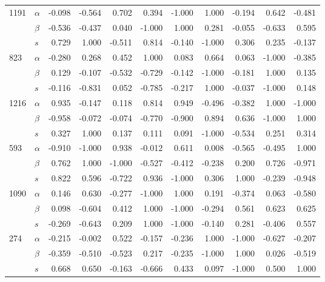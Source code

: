 \begin{longtable}{llrrrrrrrrr}
\cline{1-11}
\multirow{3}{*}{1191} & $\alpha$ & -0.098 & -0.564 &  0.702 &  0.394 & -1.000 &  1.000 & -0.194 &  0.642 & -0.481 \\
     & $\beta$ & -0.536 & -0.437 &  0.040 & -1.000 &  1.000 &  0.281 & -0.055 & -0.633 &  0.595 \\
     & $s$ &  0.729 &  1.000 & -0.511 &  0.814 & -0.140 & -1.000 &  0.306 &  0.235 & -0.137 \\
\cline{1-11}
\multirow{3}{*}{823} & $\alpha$ & -0.280 &  0.268 &  0.452 &  1.000 &  0.083 &  0.664 &  0.063 & -1.000 & -0.385 \\
     & $\beta$ &  0.129 & -0.107 & -0.532 & -0.729 & -0.142 & -1.000 & -0.181 &  1.000 &  0.135 \\
     & $s$ & -0.116 & -0.831 &  0.052 & -0.785 & -0.217 &  1.000 & -0.037 & -1.000 &  0.148 \\
\cline{1-11}
\multirow{3}{*}{1216} & $\alpha$ &  0.935 & -0.147 &  0.118 &  0.814 &  0.949 & -0.496 & -0.382 &  1.000 & -1.000 \\
     & $\beta$ & -0.958 & -0.072 & -0.074 & -0.770 & -0.900 &  0.894 &  0.636 & -1.000 &  1.000 \\
     & $s$ &  0.327 &  1.000 &  0.137 &  0.111 &  0.091 & -1.000 & -0.534 &  0.251 &  0.314 \\
\cline{1-11}
\multirow{3}{*}{593} & $\alpha$ & -0.910 & -1.000 &  0.938 & -0.012 &  0.611 &  0.008 & -0.565 & -0.495 &  1.000 \\
     & $\beta$ &  0.762 &  1.000 & -1.000 & -0.527 & -0.412 & -0.238 &  0.200 &  0.726 & -0.971 \\
     & $s$ &  0.822 &  0.596 & -0.722 &  0.936 & -1.000 &  0.306 &  1.000 & -0.239 & -0.948 \\
\cline{1-11}
\multirow{3}{*}{1090} & $\alpha$ &  0.146 &  0.630 & -0.277 & -1.000 &  1.000 &  0.191 & -0.374 &  0.063 & -0.580 \\
     & $\beta$ &  0.098 & -0.604 &  0.412 &  1.000 & -1.000 & -0.294 &  0.561 &  0.623 &  0.625 \\
     & $s$ & -0.269 & -0.643 &  0.209 &  1.000 & -1.000 & -0.140 &  0.281 & -0.406 &  0.557 \\
\cline{1-11}
\multirow{3}{*}{274} & $\alpha$ & -0.215 & -0.002 &  0.522 & -0.157 & -0.236 &  1.000 & -1.000 & -0.627 & -0.207 \\
     & $\beta$ & -0.359 & -0.510 & -0.523 &  0.217 & -0.235 & -1.000 &  1.000 &  0.026 & -0.519 \\
     & $s$ &  0.668 &  0.650 & -0.163 & -0.666 &  0.433 &  0.097 & -1.000 &  0.500 &  1.000 \\

\end{longtable}
